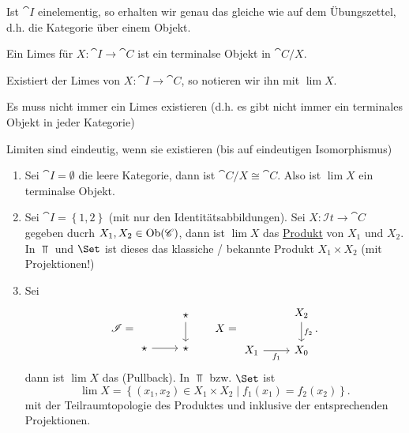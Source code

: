 \begin{oral}
    Ist $\cat{I}$ einelementig, so erhalten wir genau das gleiche wie auf dem Übungszettel, d.h. die Kategorie über einem Objekt.
\end{oral}

\begin{definition}[Limes]\label{def:limes}
    Ein Limes für $X \colon  \cat{I} \to  \cat{C}$ ist ein terminalse Objekt in $\cat{C} / X$.
\end{definition}
\begin{dnotation}
    Existiert der Limes von $X \colon  \cat{I} \to  \cat{C}$, so notieren wir ihn mit $\lim X$.
\end{dnotation}

\begin{warning}
    Es muss nicht immer ein Limes existieren (d.h. es gibt nicht immer ein terminales Objekt in jeder Kategorie)
\end{warning}

\begin{oral}
    Limiten sind eindeutig, wenn sie existieren (bis auf eindeutigen Isomorphismus)
\end{oral}

\begin{example}
    \begin{enumerate}[1)]
        \item Sei $\cat{I} = \emptyset$ die leere Kategorie, dann ist $\cat{C} / X \cong \cat{C}$. Also ist $\lim X$ ein terminalse Objekt.
        \item Sei $\cat{I} = \left \{1,2\right\} $ (mit nur den Identitätsabbildungen). Sei $X\colon  \mathcal{I}t \to  \cat{C}$ gegeben ducrh $X_1,X_2\in \operatorname{Ob}(\mathscr{C})$, dann ist $\lim X$ das  \underline{Produkt} von $X_1$ und $X_2$. \\
            In $\Top$ und  $\Set$ ist dieses das klassiche / bekannte Produkt  $X_1\times X_2$ (mit Projektionen!)
        \item Sei 
            \[
            \cat{I} = 
            \begin{tikzcd}
                & \star \ar{d} \\
                \star \ar{r} & \star 
            \end{tikzcd}
            \qquad
            X = 
            \begin{tikzcd}
                & X_2 \ar{d}{f_2} \\
                X_1 \ar[swap]{r}{f_1} & X_0
            \end{tikzcd}
            .\] 
            dann ist $\lim X$ das   (Pullback). In $\Top$ bzw.  $\Set$ ist
             \[
                 \lim X = \left \{(x_1,x_2) \in  X_1\times X_2 \mid  f_1(x_1) = f_2(x_2)\right\} 
            .\] 
            mit der Teilraumtopologie des Produktes und inklusive der entsprechenden Projektionen.
    \end{enumerate}
\end{example}

